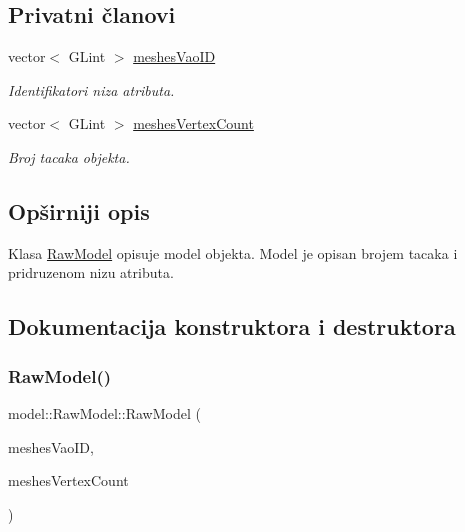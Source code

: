 \subsection*{Privatni članovi}
\begin{DoxyCompactItemize}
\item 
vector$<$ G\+Lint $>$ \hyperlink{classmodel_1_1RawModel_a994176411e71716620d422dd56febbac}{meshes\+Vao\+ID}
\begin{DoxyCompactList}\small\item\em Identifikatori niza atributa. \end{DoxyCompactList}\item 
vector$<$ G\+Lint $>$ \hyperlink{classmodel_1_1RawModel_a9a6ad9eb37bd6453ec115c2195d7f8a2}{meshes\+Vertex\+Count}
\begin{DoxyCompactList}\small\item\em Broj tacaka objekta. \end{DoxyCompactList}\end{DoxyCompactItemize}


\subsection{Opširniji opis}
Klasa \hyperlink{classmodel_1_1RawModel}{Raw\+Model} opisuje model objekta. Model je opisan brojem tacaka i pridruzenom nizu atributa. 

\subsection{Dokumentacija konstruktora i destruktora}
\mbox{\label{classmodel_1_1RawModel_ab1f77c2fa73575a79b65bae30cec98a6}} 
\subsubsection{\texorpdfstring{Raw\+Model()}{RawModel()}}
{\footnotesize\ttfamily model\+::\+Raw\+Model\+::\+Raw\+Model (\begin{DoxyParamCaption}\item[{vector$<$ G\+Lint $>$}]{meshes\+Vao\+ID,  }\item[{vector$<$ G\+Lint $>$}]{meshes\+Vertex\+Count }\end{DoxyParamCaption})}



